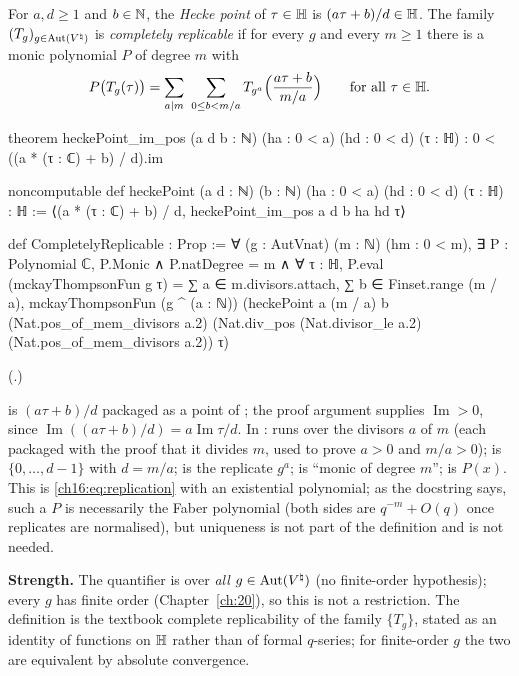 \begin{definition}\label{ch16:def:replicable}
For $a,d\ge1$ and $b\in{\mathbb{N}}$, the \emph{Hecke point} of $\tau\in\mathbb{H}$ is $(a\tau+b)/d\in\mathbb{H}$.  The family
$(T_g)_{g\in\operatorname{Aut}({V^{\natural}})}$ is \emph{completely replicable} if for every $g$ and every $m\ge1$ there is a monic
polynomial $P$ of degree $m$ with
\begin{equation*}
  P\bigl(T_g(\tau)\bigr)=\sum_{a\mid m}\ \sum_{0\le b<m/a}T_{g^a}\Bigl(\frac{a\tau+b}{m/a}\Bigr)
  \qquad\text{for all }\tau\in\chsixteenH .
\end{equation*}
\end{definition}
\begin{leancode}
theorem heckePoint_im_pos (a d b : ℕ) (ha : 0 < a) (hd : 0 < d) (τ : ℍ) :
    0 < ((a * (τ : ℂ) + b) / d).im

noncomputable def heckePoint (a d : ℕ) (b : ℕ) (ha : 0 < a) (hd : 0 < d) (τ : ℍ) : ℍ :=
  ⟨(a * (τ : ℂ) + b) / d, heckePoint_im_pos a d b ha hd τ⟩

def CompletelyReplicable : Prop :=
  ∀ (g : AutVnat) (m : ℕ) (hm : 0 < m), ∃ P : Polynomial ℂ, P.Monic ∧ P.natDegree = m ∧
    ∀ τ : ℍ, P.eval (mckayThompsonFun g τ) =
      ∑ a ∈ m.divisors.attach, ∑ b ∈ Finset.range (m / a),
        mckayThompsonFun (g ^ (a : ℕ)) (heckePoint a (m / a) b (Nat.pos_of_mem_divisors a.2)
          (Nat.div_pos (Nat.divisor_le a.2) (Nat.pos_of_mem_divisors a.2)) τ)
\end{leancode}
(.)
\begin{dictionary}
 is $(a\tau+b)/d$ packaged as a point of ; the proof argument
 supplies $\operatorname{Im}>0$, since $\operatorname{Im}((a\tau+b)/d)=a\operatorname{Im}\tau/d$.
In :  runs over the divisors $a$ of $m$ (each packaged with the proof
that it divides $m$, used to prove $a>0$ and $m/a>0$);  is $\{0,\dots,d-1\}$ with
$d=m/a$;  is the replicate $g^a$;  is ``monic of degree $m$'';
 is $P(x)$.  This is \eqref{ch16:eq:replication} with an existential polynomial; as the docstring says,
such a $P$ is necessarily the Faber polynomial (both sides are $q^{-m}+O(q)$ once replicates are normalised), but
uniqueness is not part of the definition and is not needed.

\textbf{Strength.}  The quantifier is over \emph{all} $g\in\operatorname{Aut}({V^{\natural}})$ (no finite-order hypothesis); every $g$ has
finite order (Chapter~\ref{ch:20}), so this is not a restriction.  The definition is the textbook complete
replicability of the family $\{T_g\}$, stated as an identity of functions on $\mathbb{H}$ rather than of formal
$q$-series; for finite-order $g$ the two are equivalent by absolute convergence.
\end{dictionary}
